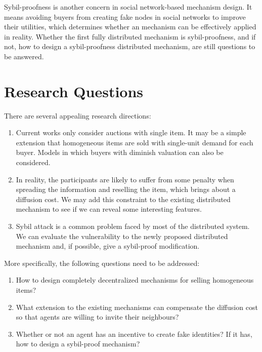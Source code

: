 \documentclass[format=acmsmall, review=false, natbib=false]{acmart}
\begin{document}
Sybil-proofness \cite{stannat2021achieving} is another concern in social network-based mechanism design. 
It means avoiding buyers from creating fake nodes in social networks to improve their utilities,
which determines whether an mechanism can be effectively applied in reality.
Whether the first fully distributed mechanism is sybil-proofness,
and if not, how to design a sybil-proofness distributed mechanism,
are still questions to be answered.

\section{Research Questions}
There are several appealing research directions:
\begin{enumerate}
    \item Current works only consider auctions with single item. It may be a simple extension that homogeneous items are sold with single-unit demand for each buyer. Models in which buyers with diminish valuation can also be considered.
    \item In reality, the participants are likely to suffer from some penalty when spreading the information and reselling the item, which brings about a diffusion cost. We may add this constraint to the existing distributed mechanism to see if we can reveal some interesting features. 
    \item Sybil attack is a common problem faced by most of the distributed system. We can evaluate the vulnerability to the newly proposed distributed mechanism and, if possible, give a sybil-proof modification.
\end{enumerate}

More specifically, the following  questions need to be addressed:
\begin{enumerate}
    \item How to design completely decentralized mechanisms for selling homogeneous items?
    \item What extension to the existing mechanisms can compensate the diffusion cost so that agents are willing to invite their neighbours?
    \item Whether or not an agent has an incentive to create fake identities? If it has, how to design a sybil-proof mechanism?
\end{enumerate}
\end{document}
